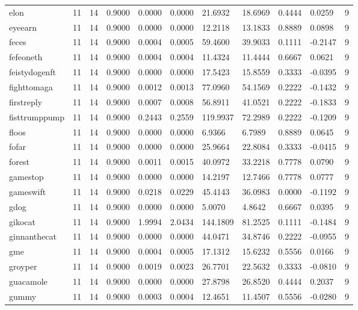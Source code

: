 \begin{table}[htbp]
\begin{tabular}{lllllllllll}
elon & 11 & 14 & 0.9000 & 0.0000 & 0.0000 & 21.6932 & 18.6969 & 0.4444 & 0.0259 & 9 \\
eyeearn & 11 & 14 & 0.9000 & 0.0000 & 0.0000 & 12.2118 & 13.1833 & 0.8889 & 0.0898 & 9 \\
feces & 11 & 14 & 0.9000 & 0.0004 & 0.0005 & 59.4600 & 39.9033 & 0.1111 & -0.2147 & 9 \\
fefeoneth & 11 & 14 & 0.9000 & 0.0004 & 0.0004 & 11.4324 & 11.4444 & 0.6667 & 0.0621 & 9 \\
feistydogenft & 11 & 14 & 0.9000 & 0.0000 & 0.0000 & 17.5423 & 15.8559 & 0.3333 & -0.0395 & 9 \\
fighttomaga & 11 & 14 & 0.9000 & 0.0012 & 0.0013 & 77.0960 & 54.1569 & 0.2222 & -0.1432 & 9 \\
firstreply & 11 & 14 & 0.9000 & 0.0007 & 0.0008 & 56.8911 & 41.0521 & 0.2222 & -0.1833 & 9 \\
fisttrumppump & 11 & 14 & 0.9000 & 0.2443 & 0.2559 & 119.9937 & 72.2989 & 0.2222 & -0.1209 & 9 \\
floos & 11 & 14 & 0.9000 & 0.0000 & 0.0000 & 6.9366 & 6.7989 & 0.8889 & 0.0645 & 9 \\
fofar & 11 & 14 & 0.9000 & 0.0000 & 0.0000 & 25.9664 & 22.8084 & 0.3333 & -0.0415 & 9 \\
forest & 11 & 14 & 0.9000 & 0.0011 & 0.0015 & 40.0972 & 33.2218 & 0.7778 & 0.0790 & 9 \\
gamestop & 11 & 14 & 0.9000 & 0.0000 & 0.0000 & 14.2197 & 12.7466 & 0.7778 & 0.0777 & 9 \\
gameswift & 11 & 14 & 0.9000 & 0.0218 & 0.0229 & 45.4143 & 36.0983 & 0.0000 & -0.1192 & 9 \\
gdog & 11 & 14 & 0.9000 & 0.0000 & 0.0000 & 5.0070 & 4.8642 & 0.6667 & 0.0395 & 9 \\
gikocat & 11 & 14 & 0.9000 & 1.9994 & 2.0434 & 144.1809 & 81.2525 & 0.1111 & -0.1484 & 9 \\
ginnanthecat & 11 & 14 & 0.9000 & 0.0000 & 0.0000 & 44.0471 & 34.8746 & 0.2222 & -0.0955 & 9 \\
gme & 11 & 14 & 0.9000 & 0.0004 & 0.0005 & 17.1312 & 15.6232 & 0.5556 & 0.0166 & 9 \\
groyper & 11 & 14 & 0.9000 & 0.0019 & 0.0023 & 26.7701 & 22.5632 & 0.3333 & -0.0810 & 9 \\
guacamole & 11 & 14 & 0.9000 & 0.0000 & 0.0000 & 27.8798 & 26.8520 & 0.4444 & 0.2037 & 9 \\
gummy & 11 & 14 & 0.9000 & 0.0003 & 0.0004 & 12.4651 & 11.4507 & 0.5556 & -0.0280 & 9 \\

\end{tabular}
\end{table}
